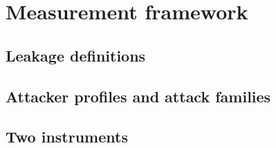 \section{Measurement framework}
\label{sec:framework}

\subsection{Leakage definitions}
\label{sec:framework-defs}

\subsection{Attacker profiles and attack families}
\label{sec:framework-profiles}

\subsection{Two instruments}
\label{sec:framework-instruments}
